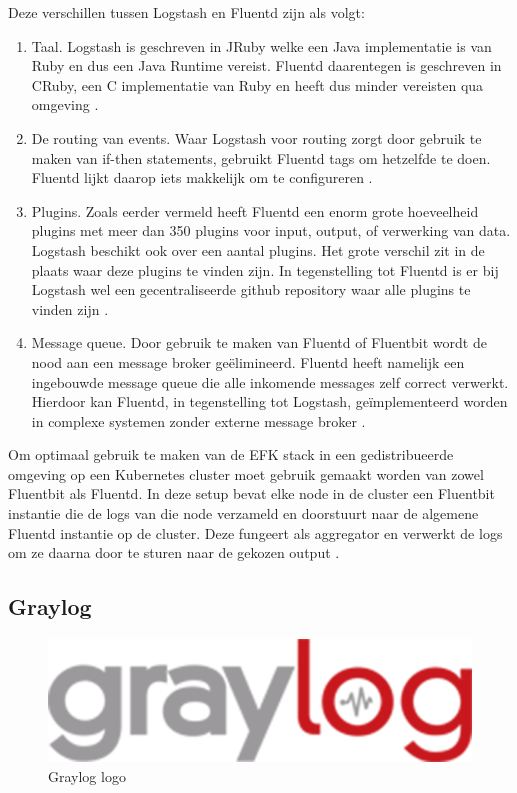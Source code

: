 Deze verschillen tussen Logstash en Fluentd zijn als volgt:
\begin{enumerate}
    \item Taal. Logstash is geschreven in JRuby welke een Java implementatie is van Ruby en dus een Java Runtime vereist. Fluentd daarentegen is geschreven in CRuby, een C implementatie van Ruby en heeft dus minder vereisten qua omgeving \autocite{harikumar2018}.
    \item De routing van events. Waar Logstash voor routing zorgt door gebruik te maken van if-then statements, gebruikt Fluentd tags om hetzelfde te doen. Fluentd lijkt daarop iets makkelijk om te configureren \autocite{harikumar2018}.
    \item Plugins. Zoals eerder vermeld heeft Fluentd een enorm grote hoeveelheid plugins met meer dan 350 plugins voor input, output, of verwerking van data. Logstash beschikt ook over een aantal plugins. Het grote verschil zit in de plaats waar deze plugins te vinden zijn. In tegenstelling tot Fluentd is er bij Logstash wel een gecentraliseerde github repository waar alle plugins te vinden zijn \autocite{harikumar2018}.
    \item Message queue. Door gebruik te maken van Fluentd of Fluentbit wordt de nood aan een message broker geëlimineerd. Fluentd heeft namelijk een ingebouwde message queue die alle inkomende messages zelf correct verwerkt. Hierdoor kan Fluentd, in tegenstelling tot Logstash, geïmplementeerd worden in complexe systemen zonder externe message broker \autocite{harikumar2018}. 
\end{enumerate}

Om optimaal gebruik te maken van de EFK stack in een gedistribueerde omgeving op een Kubernetes cluster moet gebruik gemaakt worden van zowel Fluentbit als Fluentd. In deze setup bevat elke node in de cluster een Fluentbit instantie die de logs van die node verzameld en doorstuurt naar de algemene Fluentd instantie op de cluster. Deze fungeert als aggregator en verwerkt de logs om ze daarna door te sturen naar de gekozen output \autocite{berman2018-06}.

\subsection{Graylog}

\begin{figure}[ht]
    \centering
    \includegraphics[scale=0.1]{img/graylog}
    \caption[Graylog logo]{Graylog logo \cite{graylog}}
\end{figure}

